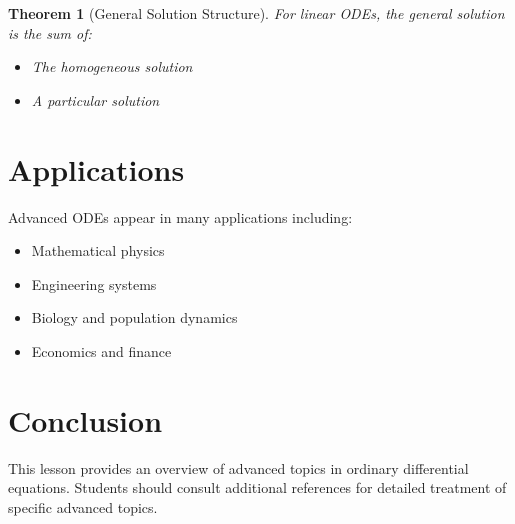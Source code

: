 \documentclass[12pt]{article}
\newtheorem{theorem}{Theorem}
\begin{document}
\begin{theorem}[General Solution Structure]
For linear ODEs, the general solution is the sum of:
\begin{itemize}
\item The homogeneous solution
\item A particular solution
\end{itemize}
\end{theorem}

\section{Applications}

Advanced ODEs appear in many applications including:
\begin{itemize}
\item Mathematical physics
\item Engineering systems
\item Biology and population dynamics
\item Economics and finance
\end{itemize}

\section{Conclusion}

This lesson provides an overview of advanced topics in ordinary differential equations. Students should consult additional references for detailed treatment of specific advanced topics.
\end{document}
